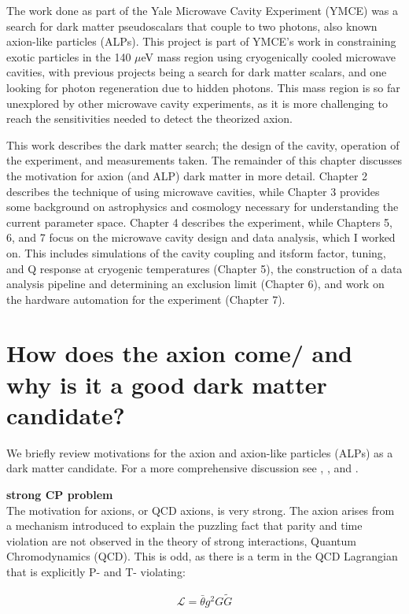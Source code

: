 \documentclass[12pt,twosides]{book}
\begin{document}
The work done as part of the Yale Microwave Cavity Experiment (YMCE) was a search for dark matter pseudoscalars that couple to two photons, also known axion-like particles (ALPs). This project is part of YMCE's work in constraining exotic particles in the 140 $\mu$eV mass region using cryogenically cooled microwave cavities, with previous projects being a search for dark matter scalars, and one looking for photon regeneration due to hidden photons. This mass region is so far unexplored by other microwave cavity experiments, as it is more challenging to reach the sensitivities needed to detect the theorized axion.

This work describes the dark matter search; the design of the cavity, operation of the experiment, and measurements taken. The remainder of this chapter discusses the motivation for axion (and ALP) dark matter in more detail. Chapter 2 describes the technique of using microwave cavities, while Chapter 3 provides some background on astrophysics and cosmology necessary for understanding the current parameter space. Chapter 4 describes the experiment, while Chapters 5, 6, and 7 focus on the microwave cavity design and data analysis, which I worked on. This includes simulations of the cavity coupling and itsform factor, tuning, and Q response at cryogenic temperatures (Chapter 5), the construction of a data analysis pipeline and determining an exclusion limit (Chapter 6), and work on the hardware automation for the experiment (Chapter 7).

\section{How does the axion come/ and why is it a good dark matter candidate?}

We briefly review motivations for the axion and axion-like particles (ALPs) as a dark matter candidate. For a more comprehensive discussion see \cite{hewett12}, \cite{arias12}, and \cite{kim87}. 

 \textbf{strong CP problem} \hfill \\

The motivation for axions, or QCD axions, is very strong. The axion arises from a mechanism introduced to explain the puzzling fact that parity and time violation are not observed in the theory of strong interactions, Quantum Chromodynamics (QCD). This is odd, as there is a term in the QCD Lagrangian that is explicitly P- and T- violating:

\begin{align*}
\mathcal{L} = \bar \theta g^2 G \tilde G
\end{align*}
\end{document}
